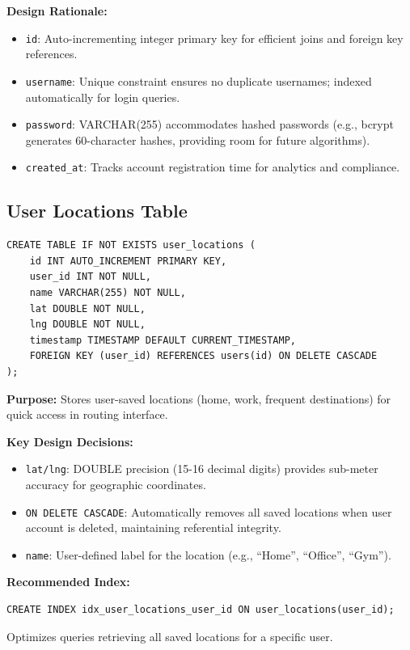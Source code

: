 \textbf{Design Rationale:}
\begin{itemize}
    \item \texttt{id}: Auto-incrementing integer primary key for efficient joins and foreign key references.
    \item \texttt{username}: Unique constraint ensures no duplicate usernames; indexed automatically for login queries.
    \item \texttt{password}: VARCHAR(255) accommodates hashed passwords (e.g., bcrypt generates 60-character hashes, providing room for future algorithms).
    \item \texttt{created\_at}: Tracks account registration time for analytics and compliance.
\end{itemize}

\subsection{User Locations Table}

\begin{verbatim}
CREATE TABLE IF NOT EXISTS user_locations (
    id INT AUTO_INCREMENT PRIMARY KEY,
    user_id INT NOT NULL,
    name VARCHAR(255) NOT NULL,
    lat DOUBLE NOT NULL,
    lng DOUBLE NOT NULL,
    timestamp TIMESTAMP DEFAULT CURRENT_TIMESTAMP,
    FOREIGN KEY (user_id) REFERENCES users(id) ON DELETE CASCADE
);
\end{verbatim}

\textbf{Purpose:} Stores user-saved locations (home, work, frequent destinations) for quick access in routing interface.

\textbf{Key Design Decisions:}
\begin{itemize}
    \item \texttt{lat/lng}: DOUBLE precision (15-16 decimal digits) provides sub-meter accuracy for geographic coordinates.
    \item \texttt{ON DELETE CASCADE}: Automatically removes all saved locations when user account is deleted, maintaining referential integrity.
    \item \texttt{name}: User-defined label for the location (e.g., ``Home'', ``Office'', ``Gym'').
\end{itemize}

\textbf{Recommended Index:}
\begin{verbatim}
CREATE INDEX idx_user_locations_user_id ON user_locations(user_id);
\end{verbatim}
Optimizes queries retrieving all saved locations for a specific user.

